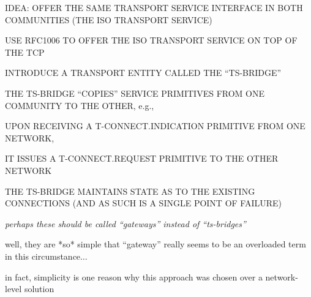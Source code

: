 \begin{bwslide}

\begin{nrtc}
\item	IDEA: OFFER THE SAME TRANSPORT SERVICE INTERFACE IN BOTH
	COMMUNITIES (THE ISO TRANSPORT SERVICE)
    \begin{nrtc}
    \item	USE RFC1006 TO OFFER THE ISO TRANSPORT SERVICE ON TOP OF
		THE TCP
    \end{nrtc}

\item	INTRODUCE A TRANSPORT ENTITY CALLED THE ``TS-BRIDGE''

\item	THE TS-BRIDGE ``COPIES'' SERVICE PRIMITIVES FROM ONE COMMUNITY TO THE
	OTHER, e.g.,
    \begin{nrtc}
    \item	UPON RECEIVING A T-CONNECT.INDICATION PRIMITIVE FROM ONE
		NETWORK,

    \item	IT ISSUES A T-CONNECT.REQUEST PRIMITIVE TO THE OTHER NETWORK
    \end{nrtc}

\item	THE TS-BRIDGE MAINTAINS STATE AS TO THE EXISTING CONNECTIONS
	(AND AS SUCH IS A SINGLE POINT OF FAILURE)
\end{nrtc}
\end{bwslide}


\begin{note}\em
perhaps these should be called ``gateways'' instead of ``ts-bridges''

well, they are *so* simple that ``gateway'' really seems to be an overloaded
term in this circumstance$\ldots$

in fact, simplicity is one reason why this approach was chosen over a
network-level solution
\end{note}


